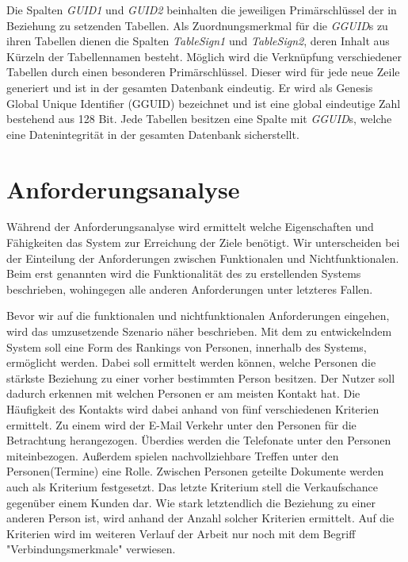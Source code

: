Die Spalten \textit{GUID1} und \textit{GUID2} beinhalten die jeweiligen Primärschlüssel der in Beziehung zu setzenden Tabellen. Als Zuordnungsmerkmal für die \textit{GGUID}s zu ihren Tabellen dienen die Spalten \textit{TableSign1} und \textit{TableSign2}, deren Inhalt aus Kürzeln der Tabellennamen besteht. Möglich wird die Verknüpfung verschiedener Tabellen durch einen besonderen Primärschlüssel. Dieser wird für jede neue Zeile generiert und ist in der gesamten Datenbank eindeutig. Er wird als Genesis Global Unique Identifier (GGUID) bezeichnet und ist eine global eindeutige Zahl bestehend aus 128 Bit. Jede Tabellen besitzen eine Spalte mit \textit{GGUID}s, welche eine Datenintegrität in der gesamten Datenbank sicherstellt.

\section{Anforderungsanalyse}
\label{ch:Systemanalyse:sec:Anforderungsanalyse}

Während der Anforderungsanalyse wird ermittelt welche Eigenschaften und Fähigkeiten das System zur Erreichung der Ziele benötigt. Wir unterscheiden bei der Einteilung der Anforderungen zwischen Funktionalen und Nichtfunktionalen. Beim erst genannten wird die Funktionalität des zu erstellenden Systems beschrieben, wohingegen alle anderen Anforderungen unter letzteres Fallen. 

Bevor wir auf die funktionalen und nichtfunktionalen Anforderungen eingehen, wird das umzusetzende Szenario näher beschrieben. Mit dem zu entwickelndem System soll eine Form des Rankings von Personen, innerhalb des Systems, ermöglicht werden. Dabei soll ermittelt werden können, welche Personen die stärkste Beziehung zu einer vorher bestimmten Person besitzen. Der Nutzer soll dadurch erkennen mit welchen Personen er am meisten Kontakt hat. Die Häufigkeit des Kontakts wird dabei anhand von fünf verschiedenen Kriterien ermittelt. Zu einem wird der E-Mail Verkehr unter den Personen für die Betrachtung herangezogen. Überdies werden die Telefonate unter den Personen miteinbezogen. Außerdem spielen nachvollziehbare Treffen unter den Personen(Termine) eine Rolle. Zwischen Personen geteilte Dokumente werden auch als Kriterium festgesetzt. Das letzte Kriterium stell die Verkaufschance gegenüber einem Kunden dar. Wie stark letztendlich die Beziehung zu einer anderen Person ist, wird anhand der Anzahl solcher Kriterien ermittelt. Auf die Kriterien wird im weiteren Verlauf der Arbeit nur noch mit dem Begriff "Verbindungsmerkmale" verwiesen.   

